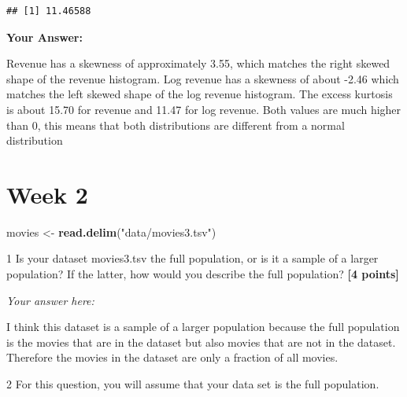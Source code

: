 \documentclass[
]{article}
\newenvironment{Shaded}{\begin{snugshade}}{\end{snugshade}}
\newcommand{\FunctionTok}[1]{\textcolor[rgb]{0.13,0.29,0.53}{\textbf{#1}}}
\newcommand{\NormalTok}[1]{#1}
\newcommand{\OtherTok}[1]{\textcolor[rgb]{0.56,0.35,0.01}{#1}}
\newcommand{\StringTok}[1]{\textcolor[rgb]{0.31,0.60,0.02}{#1}}
\begin{document}
\begin{verbatim}
## [1] 11.46588
\end{verbatim}

\textbf{Your Answer:}

Revenue has a skewness of approximately 3.55, which matches the right
skewed shape of the revenue histogram. Log revenue has a skewness of
about -2.46 which matches the left skewed shape of the log revenue
histogram. The excess kurtosis is about 15.70 for revenue and 11.47 for
log revenue. Both values are much higher than 0, this means that both
distributions are different from a normal distribution

\section{Week 2}\label{week-2}

\begin{Shaded}
\begin{Highlighting}[]
\NormalTok{movies }\OtherTok{\textless{}{-}} \FunctionTok{read.delim}\NormalTok{(}\StringTok{"data/movies3.tsv"}\NormalTok{)}
\end{Highlighting}
\end{Shaded}

1 Is your dataset movies3.tsv the full population, or is it a sample of
a larger population? If the latter, how would you describe the full
population? \textbf{[4 points]}

\emph{Your answer here:}

I think this dataset is a sample of a larger population because the full
population is the movies that are in the dataset but also movies that
are not in the dataset. Therefore the movies in the dataset are only a
fraction of all movies.

2 For this question, you will assume that your data set is the full
population.
\end{document}
